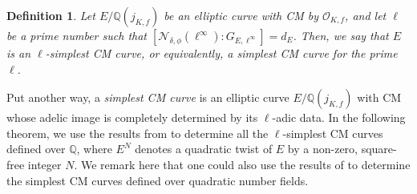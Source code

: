 \documentclass[11pt]{amsart}
\newtheorem{definition}[defn]{Definition}
\theoremstyle{definition}
\newcommand{\Q}{\mathbb{Q}}
\newcommand{\Of}{\mathcal{O}_{K,f}}
\begin{document}
 
\begin{definition}\label{def-ell-simplest}
    Let $E/\Q(j_{K,f})$ be an elliptic curve with CM by $\Of$, and let $\ell$ be a prime number such that $[\mathcal{N}_{\delta, \phi}(\ell^{\infty}) : G_{E, \ell^{\infty}}] = d_E$. Then, we say that $E$ is an \emph{$\ell$-simplest CM curve}, or equivalently, a \emph{simplest CM curve for the prime $\ell$}. 
\end{definition}

Put another way, a \emph{simplest CM curve} is an elliptic curve $E/\Q(j_{K,f})$ with CM whose adelic image is completely determined by its $\ell$-adic data. In the following theorem, we use the results from \cite{modelspaper} to determine all the $\ell$-simplest CM curves defined over $\Q$, where  $E^N$ denotes a quadratic twist of $E$ by a non-zero, square-free integer $N$. We remark here that one could also use the results of \cite{modelspaper} to determine the simplest CM curves defined over quadratic number fields.
\end{document}

